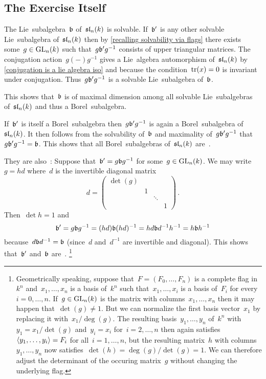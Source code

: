 \subsection*{The Exercise Itself}

The Lie~subalgebra~$\mathfrak{b}$ of~$\mathfrak{sl}_n(k)$ is solvable.
If~$\mathfrak{b}'$ is any other solvable Lie~subalgebra of~$\mathfrak{sl}_n(k)$ then by \cref{recalling solvability via flags} there exists some~$g \in \operatorname{GL}_n(k)$ such that~$g \mathfrak{b}' g^{-1}$ consists of upper triangular matrices.
The conjugation action~$g (-) g^{-1}$ gives a Lie~algebra automorphism of~$\mathfrak{sl}_n(k)$ by \cref{conjugation is a lie algebra iso} and because the condition~$\operatorname{tr}(x) = 0$ is invariant under conjugation.
Thus~$g \mathfrak{b}' g^{-1}$ is a solvable Lie~subalgebra of~$\mathfrak{b}$.

This shows that~$\mathfrak{b}$ is of maximal dimension among all solvable Lie~subalgebras of~$\mathfrak{sl}_n(k)$ and thus a Borel~subalgebra.

If~$\mathfrak{b}'$ is itself a Borel~subalgebra then~$g \mathfrak{b}' g^{-1}$ is again a Borel~subalgebra of~$\mathfrak{sl}_n(k)$.
It then follows from the solvability of~$\mathfrak{b}$ and maximality of~$g \mathfrak{b}' g^{-1}$ that~$g \mathfrak{b}' g^{-1} = \mathfrak{b}$.
This shows that all Borel~subalgebras of~$\mathfrak{sl}_n(k)$ are~{}.

They are also~{}:
Suppose that~$\mathfrak{b}' = g \mathfrak{b} g^{-1}$ for some~$g \in \operatorname{GL}_n(k)$.
We may write~$g = hd$ where~$d$ is the invertible diagonal matrix
\[
  d
  =
  \begin{pmatrix}
    \det(g) &   &         &   \\
            & 1 &         &   \\
            &   & \ddots  &   \\
            &   &         & 1
  \end{pmatrix}
  \,.
\]
Then~$\det h = 1$ and
\[
  \mathfrak{b}'
  =
  g \mathfrak{b} g^{-1}
  =
  (hd) \mathfrak{b} (hd)^{-1}
  =
  h d \mathfrak{b} d^{-1} h^{-1}
  =
  h \mathfrak{b} h^{-1}
\]
because~$d \mathfrak{b} d^{-1} = \mathfrak{b}$ (since~$d$ and~$d^{-1}$ are invertible and diagonal).
This shows that~$\mathfrak{b}'$ and~$\mathfrak{b}$ are~{}.%
\footnote{Geometrically speaking, suppose that~$F = (F_0, \dotsc, F_n)$ is a complete flag in~$k^n$ and~$x_1, \dotsc, x_n$ is a basis of~$k^n$ such that~$x_1, \dotsc, x_i$ is a basis of~$F_i$ for every~$i = 0, \dotsc, n$.
If~$g \in \operatorname{GL}_n(k)$ is the matrix with columns~$x_1, \dotsc, x_n$ then it may happen that~$\det(g) \neq 1$.
But we can normalize the first basis vector~$x_1$ by replacing it with~$x_1/\deg(g)$.
The resulting basis~$y_1, \dotsc, y_n$ of~$k^n$ with~$y_1 = x_1/\det(g)$ and~$y_i = x_i$ for~$i = 2, \dotsc, n$ then again satisfies~$\langle y_1, \dotsc, y_i\rangle = F_i$ for all~$i = 1, \dotsc, n$, but the resulting matrix~$h$ with columns~$y_1, \dotsc, y_n$ now satisfies~$\det(h) = \deg(g)/\det(g) = 1$.
We can therefore adjust the determinant of the occuring matrix~$g$ without changing the underlying flag.}

